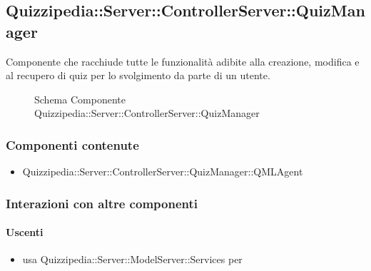 \subsection{Quizzipedia::Server::ControllerServer::QuizManager}
Componente che racchiude tutte le funzionalità adibite alla creazione, modifica e al recupero di quiz per lo svolgimento da parte di un utente.
\begin{figure}[H]
\centering
\noindent{}
\caption[Schema Componente Quizzipedia::Server::ControllerServer::QuizManager]{Schema Componente Quizzipedia::Server::ControllerServer::QuizManager}
\end{figure}
\subsubsection{Componenti contenute}
\begin{itemize}
\item Quizzipedia::Server::ControllerServer::QuizManager::QMLAgent
\end{itemize}
\subsubsection{Interazioni con altre componenti}
\paragraph{Uscenti}
\begin{itemize}
\item usa Quizzipedia::Server::ModelServer::Services per 
\end{itemize}
